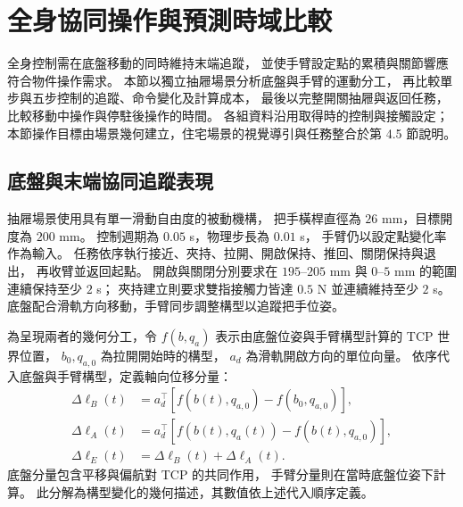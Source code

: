 \section{全身協同操作與預測時域比較}
\label{sec:wholebody_horizon_comparison}

全身控制需在底盤移動的同時維持末端追蹤，
並使手臂設定點的累積與關節響應符合物件操作需求。
本節以獨立抽屜場景分析底盤與手臂的運動分工，
再比較單步與五步控制的追蹤、命令變化及計算成本，
最後以完整開關抽屜與返回任務，比較移動中操作與停駐後操作的時間。
各組資料沿用取得時的控制與接觸設定；
本節操作目標由場景幾何建立，住宅場景的視覺導引與任務整合於第 4.5 節說明。

\subsection{底盤與末端協同追蹤表現}
\label{subsec:base_tcp_coordinated_tracking}

抽屜場景使用具有單一滑動自由度的被動機構，
把手橫桿直徑為 $26$ mm，目標開度為 $200$ mm。
控制週期為 $0.05$ s，物理步長為 $0.01$ s，
手臂仍以設定點變化率作為輸入。
任務依序執行接近、夾持、拉開、開啟保持、推回、關閉保持與退出，
再收臂並返回起點。
開啟與關閉分別要求在 $195$--$205$ mm 與 $0$--$5$ mm 的範圍連續保持至少 $2$ s；
夾持建立則要求雙指接觸力皆達 $0.5$ N 並連續維持至少 $2$ s。
底盤配合滑軌方向移動，手臂同步調整構型以追蹤把手位姿。

為呈現兩者的幾何分工，令
$f(b,q_a)$ 表示由底盤位姿與手臂構型計算的 TCP 世界位置，
$b_0,q_{a,0}$ 為拉開開始時的構型，
$a_d$ 為滑軌開啟方向的單位向量。
依序代入底盤與手臂構型，定義軸向位移分量：
\begin{equation}
    \begin{aligned}
        \Delta\ell_B(t)
        &=a_d^\top\!\left[f(b(t),q_{a,0})-f(b_0,q_{a,0})\right],\\
        \Delta\ell_A(t)
        &=a_d^\top\!\left[f(b(t),q_a(t))-f(b(t),q_{a,0})\right],\\
        \Delta\ell_E(t)&=\Delta\ell_B(t)+\Delta\ell_A(t).
    \end{aligned}
    \label{eq:ch4_coordinated_displacement_decomposition}
\end{equation}
底盤分量包含平移與偏航對 TCP 的共同作用，
手臂分量則在當時底盤位姿下計算。
此分解為構型變化的幾何描述，其數值依上述代入順序定義。

